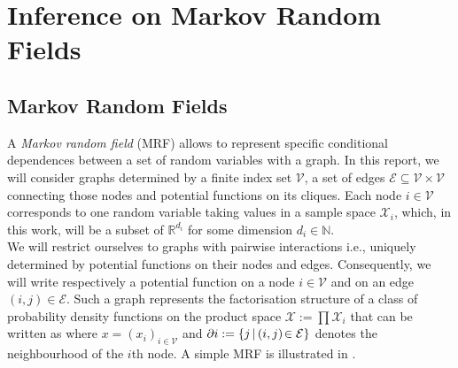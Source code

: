 

\section{Inference on Markov Random Fields}


\subsection{\label{subsection: mrf}Markov Random Fields}


%
A \emph{Markov random field} (MRF) allows to represent specific conditional dependences between a set of random variables with a graph. 
In this report, we will consider graphs determined by a finite index set $\mathcal V$, a set of edges $\mathcal E\subseteq \mathcal V\times \mathcal V$ connecting those nodes and potential functions on its cliques. Each node $i\in\mathcal V$ corresponds to one random variable taking values in a sample space $\mathcal X_i$, which, in this work, will be a subset of $\mathbb R^{d_i}$ for some dimension $d_i\in\mathbb N$. \\
We will restrict ourselves to graphs with pairwise interactions i.e., uniquely determined by potential functions on their nodes and edges. 
Consequently, we will write
%
% 
respectively a potential function on a node $i\in \mathcal V$ and on an edge $(i,j)\in \mathcal E$. 
Such a graph represents the factorisation structure of a class of probability density functions on the product space $\mathcal X := \prod\mathcal X_{i}$ that can be written as
where $x=(x_{i})_{i\in \mathcal V}$ and $\partial i:=\{j\,|\, (i,j)\!\in\,\!\mathcal E\}$ denotes the neighbourhood of the $i$th node. 
A simple MRF is illustrated in .\\

